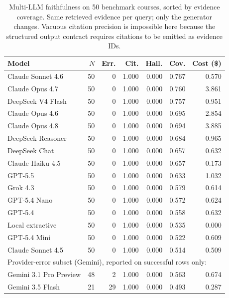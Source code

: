 \begin{table}[t]
\centering
\caption{Multi-LLM faithfulness on 50 benchmark courses, sorted by evidence coverage. Same retrieved evidence per query; only the generator changes. Vacuous citation precision is impossible here because the structured output contract requires citations to be emitted as evidence IDs.}
\label{tab:multi-llm-faithfulness}
\footnotesize
\begin{tabular}{lrrrrrr}
\hline
Model & $N$ & Err. & Cit. & Hall. & Cov. & Cost (\$) \\
\hline
Claude Sonnet 4.6 & 50 & 0 & 1.000 & 0.000 & 0.767 & 0.570 \\
Claude Opus 4.7 & 50 & 0 & 1.000 & 0.000 & 0.760 & 3.861 \\
DeepSeek V4 Flash & 50 & 0 & 1.000 & 0.000 & 0.757 & 0.951 \\
Claude Opus 4.6 & 50 & 0 & 1.000 & 0.000 & 0.695 & 2.854 \\
Claude Opus 4.8 & 50 & 0 & 1.000 & 0.000 & 0.694 & 3.885 \\
DeepSeek Reasoner & 50 & 0 & 1.000 & 0.000 & 0.684 & 0.965 \\
DeepSeek Chat & 50 & 0 & 1.000 & 0.000 & 0.657 & 0.632 \\
Claude Haiku 4.5 & 50 & 0 & 1.000 & 0.000 & 0.657 & 0.173 \\
GPT-5.5 & 50 & 0 & 1.000 & 0.000 & 0.633 & 1.032 \\
Grok 4.3 & 50 & 0 & 1.000 & 0.000 & 0.579 & 0.614 \\
GPT-5.4 Nano & 50 & 0 & 1.000 & 0.000 & 0.572 & 0.624 \\
GPT-5.4 & 50 & 0 & 1.000 & 0.000 & 0.558 & 0.632 \\
Local extractive & 50 & 0 & 1.000 & 0.000 & 0.535 & 0.000 \\
GPT-5.4 Mini & 50 & 0 & 1.000 & 0.000 & 0.522 & 0.609 \\
Claude Sonnet 4.5 & 50 & 0 & 1.000 & 0.000 & 0.514 & 0.509 \\
\hline
\multicolumn{7}{l}{\footnotesize Provider-error subset (Gemini), reported on successful rows only:} \\
Gemini 3.1 Pro Preview & 48 & 2 & 1.000 & 0.000 & 0.563 & 0.674 \\
Gemini 3.5 Flash & 21 & 29 & 1.000 & 0.000 & 0.493 & 0.287 \\
\hline
\end{tabular}
\end{table}

